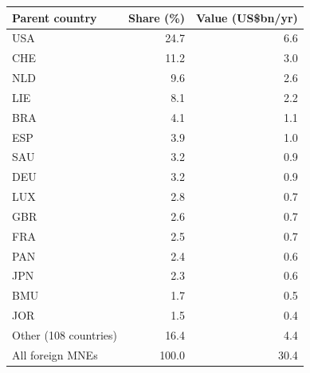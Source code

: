 \begin{tabular}{lrr}
\toprule
Parent country & Share (\%) & Value (US\$bn/yr) \\
\midrule
USA & 24.7 & 6.6 \\
CHE & 11.2 & 3.0 \\
NLD & 9.6 & 2.6 \\
LIE & 8.1 & 2.2 \\
BRA & 4.1 & 1.1 \\
ESP & 3.9 & 1.0 \\
SAU & 3.2 & 0.9 \\
DEU & 3.2 & 0.9 \\
LUX & 2.8 & 0.7 \\
GBR & 2.6 & 0.7 \\
FRA & 2.5 & 0.7 \\
PAN & 2.4 & 0.6 \\
JPN & 2.3 & 0.6 \\
BMU & 1.7 & 0.5 \\
JOR & 1.5 & 0.4 \\
Other (108 countries) & 16.4 & 4.4 \\
\midrule
All foreign MNEs & 100.0 & 30.4 \\
\bottomrule
\end{tabular}
